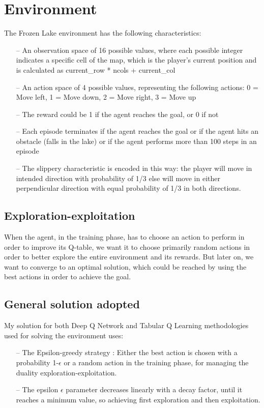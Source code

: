 \documentclass{article}
\begin{document}
\section{Environment}

The Frozen Lake environment has the following characteristics: 
\begin{itemize}
\item[--]{An observation space of 16 possible values, where each possible integer indicates a specific cell of the map, which is the player’s current position and is calculated as current\_row * ncols + current\_col}
\item[--] An action space of 4 possible values, representing the following actions: 0 = Move left, 1 = Move down, 2 = Move right, 3 = Move up
\item[--] The reward could be 1 if the agent reaches the goal, or 0 if not
\item[--] Each episode terminates if the agent reaches the goal or if the agent hits an obstacle (falls in the lake) or if the agent performs more than 100 steps in an episode
\item[--] The slippery characteristic is encoded in this way: the player will move in intended direction with probability of 1/3 else will move in either perpendicular direction with equal probability of 1/3 in both directions.
\end{itemize}

\subsection{Exploration-exploitation}

When the agent, in the training phase, has to choose an action to perform in order to improve its Q-table, we want it to choose primarily random actions in order to better explore the entire environment and its rewards.
But later on, we want to converge to an optimal solution, which could be reached by using the best actions in order to achieve the goal.


\subsection{General solution adopted}


My solution for both Deep Q Network and Tabular Q Learning methodologies used for solving the environment uses:
\begin{itemize}
\item[--] The Epsilon-greedy strategy : Either the best action is chosen with a probability 1-$\epsilon$ or a random action in the training phase, for managing the duality exploration-exploitation.
\item[--] The epsilon $\epsilon$ parameter decreases linearly with a decay factor, until it reaches a minimum value, so achieving first exploration and then exploitation.
\end{itemize}
\end{document}
